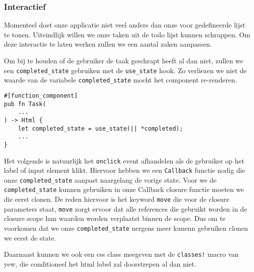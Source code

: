 \clearpage

\subsubsection{Interactief}
Momenteel doet onze applicatie niet veel anders dan onze voor gedefineerde lijst te tonen.
Uiteindlijk willen we onze taken uit de todo lijst kunnen schrappen. Om deze interactie te laten
werken zullen we een aantal zaken aanpassen.

Om bij te houden of de gebruiker de taak geschrapt heeft al dan niet, zullen we een
\texttt{completed_state} gebruiken met de \texttt{use_state} hook. Zo verliezen
we niet de waarde van de variabele \texttt{completed_state} mocht het component
re-renderen.

\begin{verbatim}
#[function_component]
pub fn Task(
    ...
) -> Html {
    let completed_state = use_state(|| *completed);
    ...
}
\end{verbatim}

Het volgende is natuurlijk het \texttt{onclick} event afhandelen als de gebruiker op het
label of input element klikt. Hiervoor hebben we een \texttt{Callback} functie nodig die
onze \texttt{completed_state} aanpast naargelang de vorige state. Voor we de
\texttt{completed_state} kunnen gebruiken in onze Callback closure functie moeten we die
eerst clonen. De reden hiervoor is het keyword \texttt{move} die voor de closure
parameters staat, \texttt{move} zorgt
ervoor dat alle references die gebruikt worden in de closure scope hun waarden worden verplaatst
binnen de scope. Dus om te voorkomen dat we onze \texttt{completed_state} nergens meer
kunenn gebruiken clonen we eerst de state.

Daarnaast kunnen we ook een css class meegeven met de \texttt{classes!} macro van yew, die
conditioneel het html label zal doorstrepen al dan niet.

\clearpage

